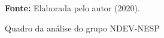 \begin{figure}[ht!]
\centering

\caption{\textmd{Quadro da análise do grupo NDEV-NESP}}
\label{fig:quadro:grupondevnesp}

\par\medskip\textbf{Fonte:} Elaborada pelo autor (2020). \par\medskip

\end{figure}
